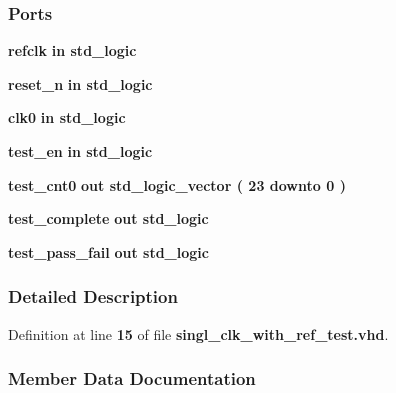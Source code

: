 \subsubsection*{Ports}
 \begin{DoxyCompactItemize}
\item 
{\bf refclk}  {\bfseries {\bfseries \textcolor{keywordflow}{in}\textcolor{vhdlchar}{ }}} {\bfseries \textcolor{comment}{std\+\_\+logic}\textcolor{vhdlchar}{ }} 
\item 
{\bf reset\+\_\+n}  {\bfseries {\bfseries \textcolor{keywordflow}{in}\textcolor{vhdlchar}{ }}} {\bfseries \textcolor{comment}{std\+\_\+logic}\textcolor{vhdlchar}{ }} 
\item 
{\bf clk0}  {\bfseries {\bfseries \textcolor{keywordflow}{in}\textcolor{vhdlchar}{ }}} {\bfseries \textcolor{comment}{std\+\_\+logic}\textcolor{vhdlchar}{ }} 
\item 
{\bf test\+\_\+en}  {\bfseries {\bfseries \textcolor{keywordflow}{in}\textcolor{vhdlchar}{ }}} {\bfseries \textcolor{comment}{std\+\_\+logic}\textcolor{vhdlchar}{ }} 
\item 
{\bf test\+\_\+cnt0}  {\bfseries {\bfseries \textcolor{keywordflow}{out}\textcolor{vhdlchar}{ }}} {\bfseries \textcolor{comment}{std\+\_\+logic\+\_\+vector}\textcolor{vhdlchar}{ }\textcolor{vhdlchar}{(}\textcolor{vhdlchar}{ }\textcolor{vhdlchar}{ } \textcolor{vhdldigit}{23} \textcolor{vhdlchar}{ }\textcolor{keywordflow}{downto}\textcolor{vhdlchar}{ }\textcolor{vhdlchar}{ } \textcolor{vhdldigit}{0} \textcolor{vhdlchar}{ }\textcolor{vhdlchar}{)}\textcolor{vhdlchar}{ }} 
\item 
{\bf test\+\_\+complete}  {\bfseries {\bfseries \textcolor{keywordflow}{out}\textcolor{vhdlchar}{ }}} {\bfseries \textcolor{comment}{std\+\_\+logic}\textcolor{vhdlchar}{ }} 
\item 
{\bf test\+\_\+pass\+\_\+fail}  {\bfseries {\bfseries \textcolor{keywordflow}{out}\textcolor{vhdlchar}{ }}} {\bfseries \textcolor{comment}{std\+\_\+logic}\textcolor{vhdlchar}{ }} 
\end{DoxyCompactItemize}


\subsubsection{Detailed Description}


Definition at line {\bf 15} of file {\bf singl\+\_\+clk\+\_\+with\+\_\+ref\+\_\+test.\+vhd}.



\subsubsection{Member Data Documentation}
